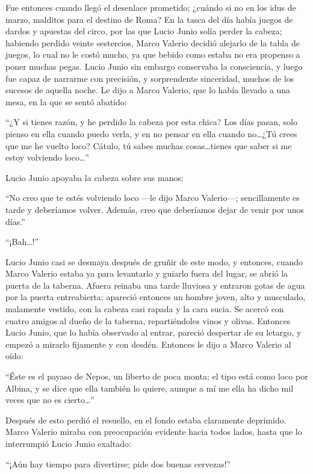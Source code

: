 \documentclass[11pt,openany]{book}
\begin{document}
Fue entonces cuando llegó el desenlace prometido; ¿cuándo si no en los idus de marzo, malditos para el destino de Roma? En la tasca del día había juegos de dardos y apuestas del circo, por las que Lucio Junio solía perder la cabeza; habiendo perdido veinte sestercios, Marco Valerio decidió alejarlo de la tabla de juegos, lo cual no le costó mucho, ya que bebido como estaba no era propenso a poner muchas pegas. Lucio Junio sin embargo conservaba la consciencia, y luego fue capaz de narrarme con precisión, y sorprendente sinceridad, muchos de los sucesos de aquella noche. Le dijo a Marco Valerio, que lo había llevado a una mesa, en la que se sentó abatido: 

“¿Y si tienes razón, y he perdido la cabeza por esta chica? Los días pasan, solo pienso en ella cuando puedo verla, y en no pensar en ella cuando no\dots ¿Tú crees que me he vuelto loco? Cátulo, tú sabes muchas cosas\dots tienes que saber si me estoy volviendo loco\dots” 

Lucio Junio apoyaba la cabeza sobre sus manos: 

“No creo que te estés volviendo loco —le dijo Marco Valerio—; sencillamente es tarde y deberíamos volver. Además, creo que deberíamos dejar de venir por unos días.” 

“¡Bah\dots!” 

Lucio Junio casi se desmaya después de gruñir de este modo, y entonces, cuando Marco Valerio estaba ya para levantarlo y guiarlo fuera del lugar, se abrió la puerta de la taberna. Afuera reinaba una tarde lluviosa y entraron gotas de agua por la puerta entreabierta; apareció entonces un hombre joven, alto y musculado, malamente vestido, con la cabeza casi rapada y la cara sucia. Se acercó con cuatro amigos al dueño de la taberna, repartiéndoles vinos y olivas. Entonces Lucio Junio, que lo había observado al entrar, pareció despertar de su letargo, y empezó a mirarlo fijamente y con desdén. Entonces le dijo a Marco Valerio al oído: 

“Éste es el payaso de Nepos, un liberto de poca monta; el tipo está como loco por Albina, y se dice que ella también lo quiere, aunque a mí me ella ha dicho mil veces que no es cierto\dots” 

Después de esto perdió el resuello, en el fondo estaba claramente deprimido. Marco Valerio miraba con preocupación evidente hacia todos lados, hasta que lo interrumpió Lucio Junio exaltado: 

“¡Aún hay tiempo para divertirse; pide dos buenas cervezas!” 
\end{document}
